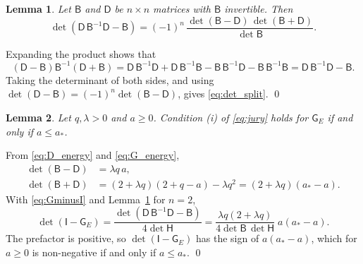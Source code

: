 \documentclass[preprint,12pt,authoryear]{elsarticle}
\newcommand{\tenI}{\mathsf{I}}
\newcommand{\tenG}{\mathsf{G}}
\providecommand{\tenD}{\mathsf{D}}
\providecommand{\tenB}{\mathsf{B}}
\newtheorem{lem}{Lemma}
\providecommand{\tenH}{\mathsf{H}}
\begin{document}
\begin{appendix}
\begin{lem}
\label{lem:det_split}
Let $\tenB$ and $\tenD$ be $n \times n$ matrices with $\tenB$ invertible. Then
\begin{equation}
    \det\left(\tenD\,\tenB^{-1}\tenD - \tenB\right) = (-1)^n\,\frac{\det(\tenB - \tenD)\,\det(\tenB + \tenD)}{\det\tenB} .
    \label{eq:det_split}
\end{equation}
\end{lem}

\begin{pf}
Expanding the product shows that
\begin{equation}
    \left(\tenD - \tenB\right)\tenB^{-1}\left(\tenD + \tenB\right)
    = \tenD\,\tenB^{-1}\tenD + \tenD\,\tenB^{-1}\tenB - \tenB\,\tenB^{-1}\tenD - \tenB\,\tenB^{-1}\tenB
    = \tenD\,\tenB^{-1}\tenD - \tenB .
    \label{eq:factor_DB}
\end{equation}
Taking the determinant of both sides, and using $\det(\tenD - \tenB) = (-1)^n\det(\tenB - \tenD)$, gives \autoref{eq:det_split}. \qed
\end{pf}

\begin{lem}
\label{lem:cond_i}
Let $q, \lambda > 0$ and $a \geq 0$. Condition (i) of \autoref{eq:jury} holds for $\tenG_E$ if and only if $a \leq a_*$.
\end{lem}

\begin{pf}
From \autoref{eq:D_energy} and \autoref{eq:G_energy},
\begin{equation}
    \begin{split}
    \det\left(\tenB - \tenD\right) &= \lambda q\, a, \\
    \det\left(\tenB + \tenD\right) &= \left(2 + \lambda q\right)\left(2 + q - a\right) - \lambda q^2 = \left(2 + \lambda q\right)\left(a_* - a\right).
    \end{split}
    \label{eq:dets_pm}
\end{equation}
With \autoref{eq:GminusI} and Lemma~\ref{lem:det_split} for $n = 2$,
\begin{equation}
    \det\left(\tenI - \tenG_E\right) = \frac{\det\left(\tenD\,\tenB^{-1}\tenD - \tenB\right)}{4\det\tenH}
    = \frac{\lambda q\left(2 + \lambda q\right)}{4\det\tenB\,\det\tenH}\; a\left(a_* - a\right).
    \label{eq:detGminusI}
\end{equation}
The prefactor is positive, so $\det(\tenI - \tenG_E)$ has the sign of $a(a_* - a)$, which for $a \geq 0$ is non-negative if and only if $a \leq a_*$. \qed
\end{pf}


\end{appendix}
\end{document}
